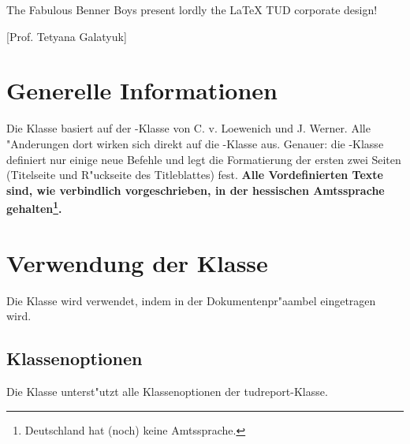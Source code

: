 \documentclass[article,dr=phil,type=drfinal,colorback,accentcolor=tud9c]{tudthesis}
\begin{document}
    {The Fabulous Benner Boys present lordly the {\LaTeX} TUD corporate design!}
  \author{Ben Gebhardt}
  [Prof. Tetyana Galatyuk]
  \dateofexam{\today}{\today}
  \makethesistitle

  \section{Generelle Informationen}
    Die Klasse basiert auf der -Klasse von C. v. Loewenich und
    J. Werner. Alle "Anderungen dort wirken sich direkt auf die
    -Klasse aus. Genauer: die -Klasse definiert nur einige
    neue Befehle und legt die Formatierung der ersten zwei Seiten (Titelseite
    und R"uckseite des Titleblattes) fest. \textbf{Alle Vordefinierten Texte sind, wie verbindlich vorgeschrieben, in der hessischen Amtssprache
    gehalten\footnote{Deutschland hat (noch) keine Amtssprache.}.}

  \section{Verwendung der Klasse}
    Die Klasse wird verwendet, indem in der Dokumentenpr"aambel
    eingetragen wird.

  \subsection{Klassenoptionen}
    Die Klasse unterst"utzt alle Klassenoptionen der tudreport-Klasse.
\end{document}
